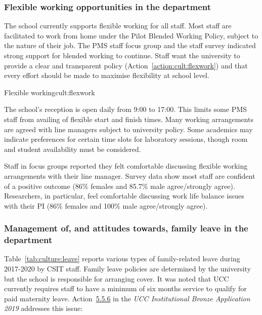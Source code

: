 





\subsubsection{Flexible working opportunities in the department}

The school currently supports flexible working for all staff.  Most staff are facilitated to work from home under the Pilot Blended Working Policy, subject to the nature of their job.
The PMS staff focus group and the staff survey indicated strong support for blended working to continue. Staff want the university to provide a clear and transparent policy (Action~\ref{action:cult:flexwork}) and that every effort should be made to maximise flexibility at school level. 

\begin{actionblock}{\ksspace{}Flexible working}{cult:flexwork}
\actadoptflex
\hfill{
    \hypersetup{hidelinks}
    \hyperlink{e5}{\gotoactionsymbol{}}
}
\end{actionblock}
 
The school's reception is open daily from 9:00 to 17:00. This limits some PMS staff from availing of flexible start and finish times. Many working arrangements are agreed with line managers subject to university policy. Some academics may indicate preferences for certain time slots for laboratory sessions, though room and student availability must be considered. 

Staff in focus groups reported they felt comfortable discussing flexible working arrangements with their line manager. Survey data show most staff are confident of a positive outcome (86\% females and 85.7\% male agree/strongly agree). Researchers, in particular, feel comfortable discussing work life balance issues with their PI (86\% females and 100\% male agree/strongly agree). 



\subsubsection{Management of, and attitudes towards,  family leave in the department}

Table~\ref{tab:culture:leave} reports various types of family-related leave during 2017-2020 by CSIT staff.
Family leave policies are determined by the university but the school is responsible for arranging cover. 
It was noted that UCC currently requires staff to have a minimum of six months service to qualify for paid maternity leave. Action~\hyperlink{act556}{5.5.6} in the \textit{UCC Institutional Bronze Application 2019} addresses this issue:  

